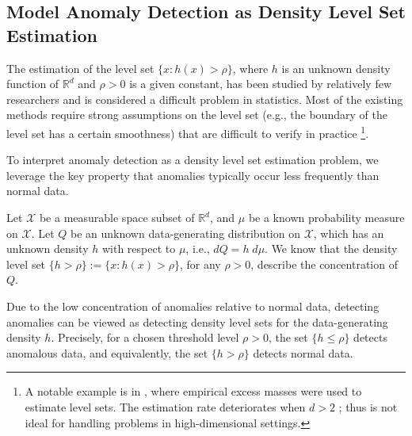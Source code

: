 \documentclass{article}
\def\RR{\mathbb R}
\begin{document}
\subsection{Model Anomaly Detection as Density Level Set Estimation}
\label{section:AD_as_DLSE}
The estimation of the level set $\{x: h(x)>\rho\}$, where $h$ is an unknown density function of $\RR^d$ and $\rho>0$ is a given constant, has been studied by relatively few researchers and is considered a difficult problem in statistics. Most of the existing methods require strong assumptions on the level set (e.g., the boundary of the level set has a certain smoothness) that are difficult to verify in practice \citep{tsybakov1997nonparametric, dbscan, cholaquidis2022level} \footnote{A notable example is in \cite{tsybakov1997nonparametric}, where empirical excess masses were used to estimate level sets. The estimation rate deteriorates when $d>2$ \citep[Theorem 4]{tsybakov1997nonparametric}; thus is not ideal for handling problems in high-dimensional settings.}.
 
To interpret anomaly detection as a density level set estimation problem, we leverage the key property that 
anomalies typically occur less frequently than normal data. 

Let $\mathcal{X}$ be a measurable space subset of $\RR^d$, and $\mu$ be a known probability measure on $\mathcal{X}$. Let $Q$ be an unknown data-generating distribution on $\mathcal{X}$, which has an unknown density $h$ with respect to $\mu$, i.e., $dQ = h \; d\mu$.
We know that the density level set  $\{h > \rho\}:=\{x:h(x)>\rho\}$, for any $\rho>0$, describe the concentration of $Q$. 

Due to the low concentration of anomalies relative to normal data, detecting anomalies can be viewed as detecting density level sets for the data-generating density $h$. 
 Precisely, for a chosen threshold level $\rho>0$, the set $\{h \leq \rho\}$ detects anomalous data, and equivalently, the set $\{h > \rho\}$ detects normal data. 
 
\end{document}
